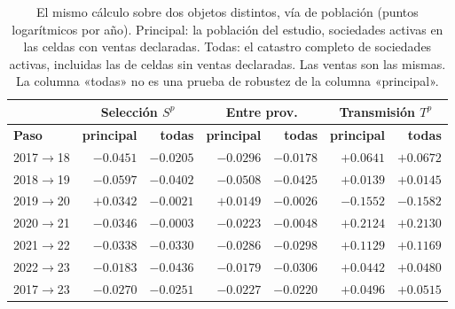 \documentclass[12pt,a4paper]{article}
\begin{document}
\begin{table}[H]
  \caption[El mismo cálculo sobre el catastro completo de sociedades activas]{El mismo cálculo sobre dos objetos distintos, vía de población (puntos logarítmicos por año). Principal: la población del estudio, sociedades activas en las celdas con ventas declaradas. Todas: el catastro completo de sociedades activas, incluidas las de celdas sin ventas declaradas. Las ventas son las mismas. La columna «todas» no es una prueba de robustez de la columna «principal».}
  \label{tab:registro}
  \small
  \begin{tabular}{|l|r|r|r|r|r|r|}
    \hline
    & \multicolumn{2}{c|}{\textbf{Selección} $S^{p}$} & \multicolumn{2}{c|}{\textbf{Entre prov.}} & \multicolumn{2}{c|}{\textbf{Transmisión} $T^{p}$} \\ \hline
    \textbf{Paso} & \textbf{principal} & \textbf{todas} & \textbf{principal} & \textbf{todas} & \textbf{principal} & \textbf{todas} \\ \hline
    2017$\to$18 & $-0.0451$ & $-0.0205$ & $-0.0296$ & $-0.0178$ & $+0.0641$ & $+0.0672$ \\ \hline
    2018$\to$19 & $-0.0597$ & $-0.0402$ & $-0.0508$ & $-0.0425$ & $+0.0139$ & $+0.0145$ \\ \hline
    2019$\to$20 & $\mathbf{+0.0342}$ & $\mathbf{-0.0021}$ & $+0.0149$ & $-0.0026$ & $-0.1552$ & $-0.1582$ \\ \hline
    2020$\to$21 & $-0.0346$ & $-0.0003$ & $-0.0223$ & $-0.0048$ & $+0.2124$ & $+0.2130$ \\ \hline
    2021$\to$22 & $-0.0338$ & $-0.0330$ & $-0.0286$ & $-0.0298$ & $+0.1129$ & $+0.1169$ \\ \hline
    2022$\to$23 & $-0.0183$ & $-0.0436$ & $-0.0179$ & $-0.0306$ & $+0.0442$ & $+0.0480$ \\ \hline
    2017$\to$23 & $-0.0270$ & $-0.0251$ & $-0.0227$ & $-0.0220$ & $+0.0496$ & $+0.0515$ \\ \hline
  \end{tabular}
\end{table}
\par
\endgroup
\end{document}
